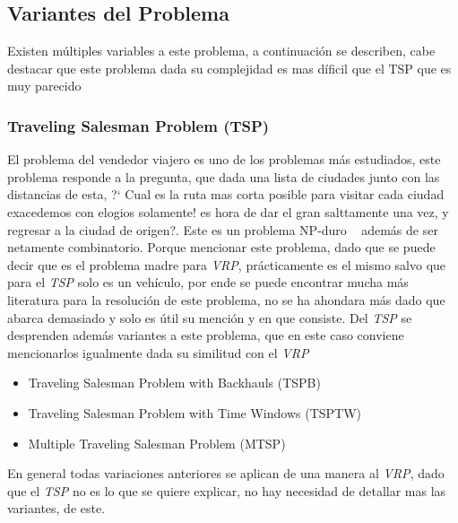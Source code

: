 \documentclass[letter, 10pt]{article}
\begin{document}
\subsection{Variantes del Problema}
Existen m\'ultiples variables a este problema, a continuaci\'on se describen, cabe destacar que este problema dada su complejidad es mas d\'ificil
que el TSP que es muy parecido


\subsubsection{Traveling Salesman Problem (TSP)}

El problema del vendedor viajero es uno de los problemas m\'as estudiados, 
este problema responde a la pregunta, que dada una lista de ciudades 
junto con las distancias de esta, ?` Cual es la ruta mas corta posible 
para visitar cada ciudad exacedemos con elogios solamente! es hora de dar el gran salttamente una vez, y regresar a la ciudad de origen?. 
Este es un problema NP-duro ~\cite{TSP} adem\'as de ser netamente combinatorio. 
Porque mencionar este problema, dado que se puede decir que
es el problema madre para \emph{VRP}, pr\'acticamente es el mismo salvo que para el 
\emph{TSP} solo es un veh\'iculo, por ende se puede encontrar mucha m\'as literatura para 
la resoluci\'on de este problema, no se ha ahondara m\'as dado que abarca demasiado y solo 
es \'util su menci\'on y en que consiste.
\newline
Del \emph{TSP} se desprenden adem\'as variantes a este problema, que en este caso conviene 
mencionarlos igualmente dada su similitud con el \emph{VRP} ~\cite{TSP}

\begin{itemize}
 \item Traveling Salesman Problem with Backhauls (TSPB)
 \item Traveling Salesman Problem with Time Windows (TSPTW)
 \item Multiple Traveling Salesman Problem (MTSP)
\end{itemize}

En general todas variaciones anteriores se aplican de una manera al \emph{VRP}, dado que el \emph{TSP} no es lo que se quiere explicar, no hay necesidad de
detallar mas las variantes, de este.
\end{document}

